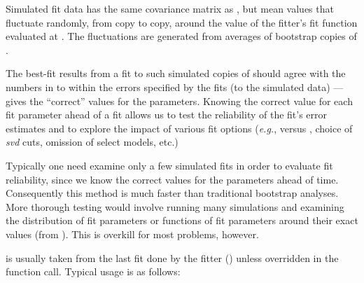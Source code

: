 \documentclass[letterpaper,10pt,english]{sphinxmanual}
\begin{document}
\begin{fulllineitems}
\begin{fulllineitems}
Simulated fit data has the same covariance matrix as 
, but mean values that 
fluctuate randomly, from copy to copy, around
the value of the fitter's fit function evaluated at . 
The fluctuations are generated from averages of bootstrap copies
of .

The best-fit results from a fit to such simulated copies of   
should agree with the numbers in  to within the errors specified
by the fits (to the simulated data) ---  gives the ``correct'' 
values for the parameters. Knowing the correct value for each 
fit parameter ahead of a fit allows us to test the reliability of
the fit's error estimates and to explore the impact of various fit 
options (\emph{e.g.},  versus , 
choice of \emph{svd} cuts, omission of select models, etc.)

Typically one need examine only a few simulated fits in order 
to evaluate fit reliability, since we know the correct values
for the parameters ahead of time. Consequently this method is
much faster than traditional bootstrap analyses. More 
thorough testing would involve running many simulations and
examining the distribution of fit parameters or functions 
of fit parameters around their exact values (from ). 
This is overkill for most problems, however.

 is usually taken from the last fit done by the fitter 
() unless overridden in the function call.
Typical usage is as follows:


\end{fulllineitems}
\end{fulllineitems}
\end{document}
